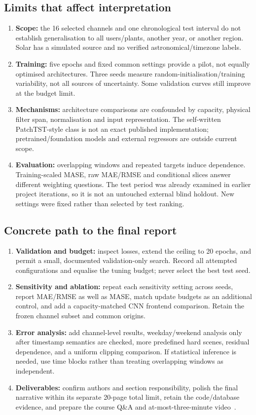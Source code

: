 \documentclass[10pt,a4paper]{article}
\begin{document}
\subsection{Limits that affect interpretation}
\begin{enumerate}
\item \textbf{Scope:} the 16 selected channels and one chronological test interval do not establish generalisation to all users/plants, another year, or another region. Solar has a simulated source and no verified astronomical/timezone labels.
\item \textbf{Training:} five epochs and fixed common settings provide a pilot, not equally optimised architectures. Three seeds measure random-initialisation/training variability, not all sources of uncertainty. Some validation curves still improve at the budget limit.
\item \textbf{Mechanisms:} architecture comparisons are confounded by capacity, physical filter span, normalisation and input representation. The self-written PatchTST-style class is not an exact published implementation; pretrained/foundation models and external regressors are outside current scope.
\item \textbf{Evaluation:} overlapping windows and repeated targets induce dependence. Training-scaled MASE, raw MAE/RMSE and conditional slices answer different weighting questions. The test period was already examined in earlier project iterations, so it is not an untouched external blind holdout. New settings were fixed rather than selected by test ranking.
\end{enumerate}
\subsection{Concrete path to the final report}
\begin{enumerate}
\item \textbf{Validation and budget:} inspect losses, extend the ceiling to 20 epochs, and permit a small, documented validation-only search. Record all attempted configurations and equalise the tuning budget; never select the best test seed.
\item \textbf{Sensitivity and ablation:} repeat each sensitivity setting across seeds, report MAE/RMSE as well as MASE, match update budgets as an additional control, and add a capacity-matched CNN frontend comparison. Retain the frozen channel subset and common origins.
\item \textbf{Error analysis:} add channel-level results, weekday/weekend analysis only after timestamp semantics are checked, more predefined hard scenes, residual dependence, and a uniform clipping comparison. If statistical inference is needed, use time blocks rather than treating overlapping windows as independent.
\item \textbf{Deliverables:} confirm authors and section responsibility, polish the final narrative within its separate 20-page total limit, retain the code/database evidence, and prepare the course Q\&A and at-most-three-minute video~\cite{course}.
\end{enumerate}
\end{document}
